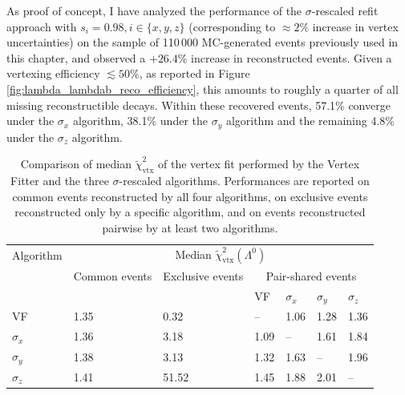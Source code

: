 As proof of concept, I have analyzed the performance of the $\sigma$-rescaled refit approach with $s_i=0.98, i\in\{x,y,z\}$ (corresponding to $\approx 2\%$ increase in vertex uncertainties) on the sample of 110\,000 MC-generated \demonstratorshort events previously used in this chapter, and observed a $+26.4\%$ increase in reconstructed events.
Given a vertexing efficiency $\lesssim 50\%$, as reported in Figure \ref{fig:lambda_lambdab_reco_efficiency}, this amounts to roughly a quarter of all missing reconstructible decays.
Within these recovered events, 57.1\% converge under the $\sigma_x$ algorithm, 38.1\% under the $\sigma_y$ algorithm and the remaining 4.8\% under the $\sigma_z$ algorithm.

\begin{table}[t]
	\begin{center}
	\begin{tabular}{@{}lllllll@{}}
		\toprule
		Algorithm & \multicolumn{6}{c}{Median $\tilde{\chi}^2_\text{vtx}(\Lambda^0)$} \\
		\cmidrule{2-7}
		& Common events & Exclusive events & \multicolumn{4}{c}{Pair-shared events}  \\
		\cmidrule{4-7}
		&&& VF & $\sigma_x$ & $\sigma_y$ & $\sigma_z$ \\
		\midrule
		VF 			& 1.35 & 0.32	& --	& 1.06	& 1.28	& 1.36	 \\
		$\sigma_x$ 	& 1.36 & 3.18	& 1.09	& --	& 1.61	& 1.84	 \\
		$\sigma_y$	& 1.38 & 3.13	& 1.32	& 1.63	& -- 	& 1.96	 \\
		$\sigma_z$ 	& 1.41 & 51.52	& 1.45	& 1.88	& 2.01	& --	 \\
		\bottomrule
	\end{tabular}
	\end{center}
	\caption{Comparison of median $\tilde{\chi}^2_\text{vtx}$ of the \lambdadecay vertex fit performed by the Vertex Fitter and the three $\sigma$-rescaled algorithms. Performances are reported on common events reconstructed by all four algorithms, on exclusive events reconstructed only by a specific algorithm, and on events reconstructed pairwise by at least two algorithms.}
	\label{tab:3:xyz_chi2_performances}
\end{table}

